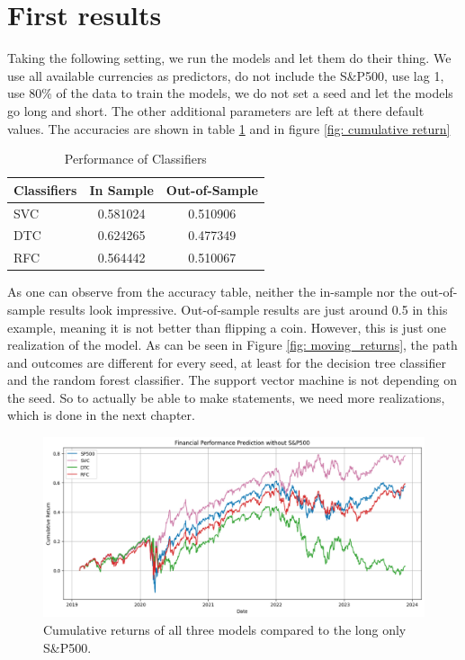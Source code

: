 \section{First results}
\label{First results}
Taking the following setting, we run the models and let them do their thing. We use all available currencies as predictors, do not include the S\&P500, use lag 1, use 80\% of the data to train the models, we do not set a seed and let the models go long and short. The other additional parameters are left at there default values. The accuracies are shown in table \ref{tab: classifier_performance} and in figure \ref{fig: cumulative return}

\begin{table}[h]
  \centering
  \begin{tabular}{lcc}
    \hline
    Classifiers & In Sample & Out-of-Sample \\
    \hline
    SVC & 0.581024 & 0.510906 \\
    DTC & 0.624265 & 0.477349 \\
    RFC & 0.564442 & 0.510067 \\
    \hline
  \end{tabular}
  \caption{Performance of Classifiers}
  \label{tab: classifier_performance}
\end{table}

\noindent As one can observe from the accuracy table, neither the in-sample nor the out-of-sample results look impressive. Out-of-sample results are just around 0.5 in this example, meaning it is not better than flipping a coin. However, this is just one realization of the model. As can be seen in Figure \ref{fig: moving_returns}, the path and outcomes are different for every seed, at least for the decision tree classifier and the random forest classifier. The support vector machine is not depending on the seed. So to actually be able to make statements, we need more realizations, which is done in the next chapter. 

\begin{figure}[h!]
\begin{center}
  \includegraphics[width=\textwidth]{images/first_visualization.png}
  \end{center}
  \caption[Model return comparison]{Cumulative returns of all three models compared to the long only S\&P500.}
  \label{fig: cumulative returns}
\end{figure}


